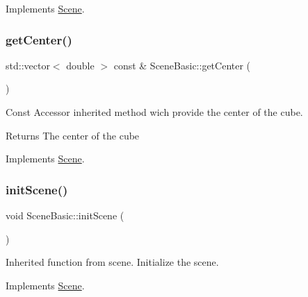 Implements \hyperlink{class_scene_a2e371aa848e8c30f593c2d9a2687dd28}{Scene}.

\hypertarget{class_scene_basic_ac805ba94deedc1f4d606d9554d088ea0}{}\label{class_scene_basic_ac805ba94deedc1f4d606d9554d088ea0} 
\subsubsection{\texorpdfstring{get\+Center()}{getCenter()}}
{\footnotesize\ttfamily std\+::vector$<$ double $>$ const  \& Scene\+Basic\+::get\+Center (\begin{DoxyParamCaption}{ }\end{DoxyParamCaption})\hspace{0.3cm}{\ttfamily [virtual]}}



Const Accessor inherited method wich provide the center of the cube. 

\begin{DoxyReturn}{Returns}
The center of the cube 
\end{DoxyReturn}


Implements \hyperlink{class_scene_a15d25044dbd65a8d7d0759888fcd55a1}{Scene}.

\hypertarget{class_scene_basic_a0575ddd74a9f9a5f238def19657f275e}{}\label{class_scene_basic_a0575ddd74a9f9a5f238def19657f275e} 
\subsubsection{\texorpdfstring{init\+Scene()}{initScene()}}
{\footnotesize\ttfamily void Scene\+Basic\+::init\+Scene (\begin{DoxyParamCaption}{ }\end{DoxyParamCaption})\hspace{0.3cm}{\ttfamily [virtual]}}



Inherited function from scene. Initialize the scene. 



Implements \hyperlink{class_scene_ae76b830c1156bb40bd744afb63776be2}{Scene}.

\hypertarget{class_scene_basic_a3a475225ffef7d3227401d762c7f2744}{}\label{class_scene_basic_a3a475225ffef7d3227401d762c7f2744} 
